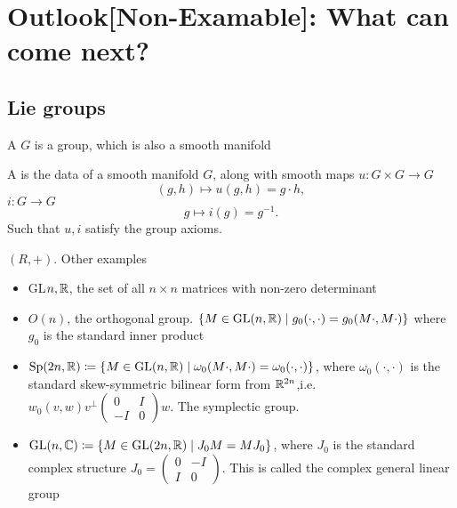 \chapter{Outlook[Non-Examable]: What can come next?}

\section{Lie groups}

\begin{definition*}
    A  \(G\) is a group, which is also a smooth manifold
\end{definition*} 

\begin{definition*}[Official]
    A  is the data of a smooth manifold \(G\), along 
    with smooth maps \(u:G\times G\to G\)
    \[(g,h)\mapsto u(g,h)=g\cdot h,\]
    \(i:G\to G\)
    \[g\mapsto i(g)=g^{-1}.\]
    Such that \(u,i\) satisfy the group axioms.
\end{definition*}

\begin{example}
    \((R,+)\). Other examples 
    \begin{itemize}
        \item GL\(n,\mathbb{R}\), the set of all \(n\times n\) matrices with non-zero determinant
        \item \(O(n)\), the orthogonal group. \(\{M\in \text{GL}(n,\mathbb{R})\mid g_0(\cdot,\cdot)=g_0(M\cdot,M\cdot)\}\) where \(g_0\) is the standard inner product 
        \item \(\text{Sp}(2n,\mathbb{R})\coloneqq \{M\in \text{GL}(n,\mathbb{R})\mid \omega_0(M\cdot,M\cdot)=\omega_0(\cdot,\cdot)\}\), where \(\omega_0(\cdot,\cdot)\) is the standard skew-symmetric bilinear form from \(\mathbb{R}^{2n}\),i.e. \(w_0(v,w)v^\perp \begin{pmatrix}
            0 & I\\
            -I & 0    
        \end{pmatrix}w\). The symplectic group.
        \item \(\text{GL}(n,\mathbb{C})\coloneqq \{M\in\text{GL}(2n,\mathbb{R})\mid J_0M=MJ_0\}\), where \(J_0\) is the standard complex structure \(J_0=\begin{pmatrix}
            0 & -I\\
            I & 0
        \end{pmatrix}\). This is called the complex general linear group
    \end{itemize}
\end{example}

